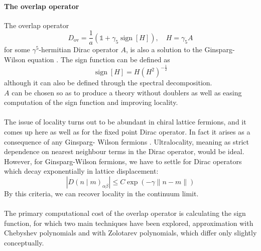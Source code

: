 \documentclass[a4paper,10pt]{book}
\begin{document}
\paragraph{The overlap operator}
The overlap operator
\begin{equation}
D_{\mathrm{ov}}=\frac{1}{a}\left(\mathbb{1}+\gamma_{5} \operatorname{sign}[H]\right), \quad H=\gamma_{5} A
\end{equation}
for some $\gamma^5$-hermitian Dirac operator $A$, is also a solution to the Ginsparg- Wilson equation \cite{PhysRevLett.81.4060}. The sign function can be defined as 
\begin{equation}
\operatorname{sign}[H] = H\left( H^2 \right)^{-\frac{1}{2}}
\end{equation}
although it can also be defined through the spectral decomposition.\\$A$ can be chosen so as to produce a theory without doublers as well as easing computation of the sign function and improving locality.\\\\The issue of locality turns out to be abundant in chiral lattice fermions, and it comes up here as well as for the fixed point Dirac operator. In fact it arises as a consequence of any Ginsparg- Wilson fermions \cite{horvath1998ginsparg}. Ultralocality, meaning as strict dependence on nearest neighbour terms in the Dirac operator, would be ideal. However, for Ginsparg-Wilson fermions, we have to settle for Dirac operators which decay exponentially in lattice displacement:
 \begin{equation}
\left|D(n \mid m)_{\alpha \beta}\right| \leq C \exp (-\gamma\|n-m\|)
\end{equation}
By this criteria, we can recover locality in the continuum limit.\\\\The primary computational cost of the overlap operator is calculating the sign function, for which two main techniques have been explored, approximation with Chebyshev polynomials and with Zolotarev polynomials, which differ only slightly conceptually.
\end{document}
